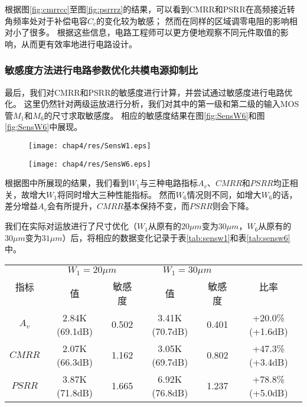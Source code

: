 根据图\ref{fig:cmrrcc}至图\ref{fig:psrrrz}的结果，可以看到CMRR和PSRR在高频接近转角频率处对于补偿电容$C_c$的变化较为敏感；
然而在同样的区域调零电阻的影响相对小了很多。
根据这些信息，电路工程师可以更方便地观察不同元件取值的影响，从而更有效率地进行电路设计。

\subsubsection{敏感度方法进行电路参数优化共模电源抑制比}

最后，我们对CMRR和PSRR的敏感度进行计算，并尝试通过敏感度进行电路优化。
这里仍然针对两级运放进行分析，我们对其中的第一级和第二级的输入MOS管$M_1$和$M_6$的尺寸求取敏感度。
相应的敏感度结果在图\ref{fig:SensW6}和图\ref{fig:SensW6}中展现。

\begin{figure}[!htp]
	\centering
	\texttt{[image: chap4/res/SensW1.eps]}
\end{figure}

\begin{figure}[!htp]
	\centering
	\texttt{[image: chap4/res/SensW6.eps]}
\end{figure}

根据图中所展现的结果，我们看到$W_1$与三种电路指标$A_v$、$CMRR$和$PSRR$均正相关，故增大$W_1$将同时增大三种性能指标。
然而$W_6$情况则不同，如增大$W_6$的话，差分增益$A_v$会有所提升，$CMRR$基本保持不变，而$PSRR$则会下降。

我们在实际对运放进行了尺寸优化（$W_1$从原有的$20\mu m$变为$30\mu m$，$W_6$从原有的$30\mu m$变为$31\mu m$）后，将相应的数据变化记录于表\ref{tab:sensw1}和表\ref{tab:sensw6}中。

\begin{table}[!htp]
	\centering
	\begin{tabular}{c|c|c|c|c|c}
		\hline
		\multirow{2}{*}{指标} & \multicolumn{2}{c|}{$W_1=20\mu m$} & \multicolumn{2}{c|}{$W_1=30\mu m$} & \multirow{2}{*}{比率} \\ \cline{2-5}
		                    &       值        &        敏感度        &       值        &        敏感度        &  \\ \hline
		       $A_v$        & 2.84K (69.1dB) &       0.502       & 3.41K (70.7dB) &       0.401       &  +20.0\% (+1.6dB)   \\ \hline
		      $CMRR$        & 2.07K (66.3dB) &       1.162       & 3.05K (69.7dB) &       0.802       &  +47.3\% (+3.4dB)   \\ \hline
		      $PSRR$        & 3.87K (71.8dB) &       1.665       & 6.92K (76.8dB) &       1.237       &  +78.8\% (+5.0dB)   \\ \hline
	\end{tabular}
\end{table}

